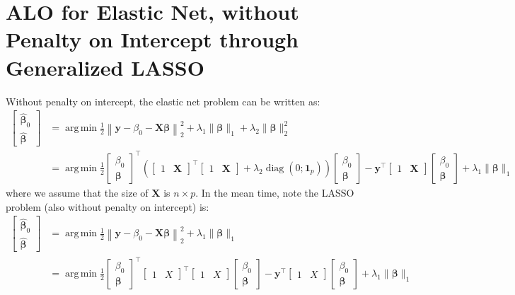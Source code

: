 \documentclass[11pt]{article}
\newcommand{\by}{\bm{y}}
\newcommand{\bX}{\bm{X}}
\newcommand{\bbeta}{\bm{\beta}}
\DeclareMathOperator{\diag}{diag}
\DeclareMathOperator*{\argmin}{arg\,min}
\begin{document}
\section{ALO for Elastic Net, without Penalty on Intercept through Generalized LASSO}
Without penalty on intercept, the elastic net problem can be written as:
\begin{align*}
\begin{bmatrix}
\hat{\bbeta}_0 \\
\hat{\bbeta}
\end{bmatrix} &= \argmin\frac{1}{2} \left\|\by - \beta_0 - \bX\bbeta\right\|_2^2 + \lambda_1 \|\bbeta\|_1 + \lambda_2 \|\bbeta\|_2^2 \\
&= \argmin\frac{1}{2} 
\begin{bmatrix}
\beta_0 \\
\bbeta
\end{bmatrix}^\top \left(
\begin{bmatrix}
1 & \bX
\end{bmatrix}^\top
\begin{bmatrix}
1 & \bX
\end{bmatrix} + 
\lambda_2 \diag(0; \bm{1}_p)
\right)
\begin{bmatrix} 
\beta_0 \\
\bbeta
\end{bmatrix} - \by^\top
\begin{bmatrix}
1 & \bX
\end{bmatrix} 
\begin{bmatrix}
\beta_0 \\
\bbeta
\end{bmatrix}   + \lambda_1 \|\bbeta\|_1
\end{align*}
where we assume that the size of $\bX$ is $n \times p$. In the mean time, note the LASSO problem (also without penalty on intercept) is:
\begin{align*}
\begin{bmatrix}
\hat{\bbeta}_0 \\
\hat{\bbeta}
\end{bmatrix} &= \argmin\frac{1}{2} \left\|\by - \beta_0 - \bX\bbeta\right\|_2^2 + \lambda_1 \|\bbeta\|_1 \\
&= \argmin\frac{1}{2} 
\begin{bmatrix}
\beta_0 \\
\bbeta
\end{bmatrix}^\top 
\begin{bmatrix}
1 & X
\end{bmatrix}^\top
\begin{bmatrix}
1 & X
\end{bmatrix} 
\begin{bmatrix} 
\beta_0 \\
\bbeta
\end{bmatrix} - \by^\top
\begin{bmatrix}
1 & X
\end{bmatrix} 
\begin{bmatrix}
\beta_0 \\
\bbeta
\end{bmatrix} +  \lambda_1 \|\bbeta\|_1
\end{align*}
\end{document}
